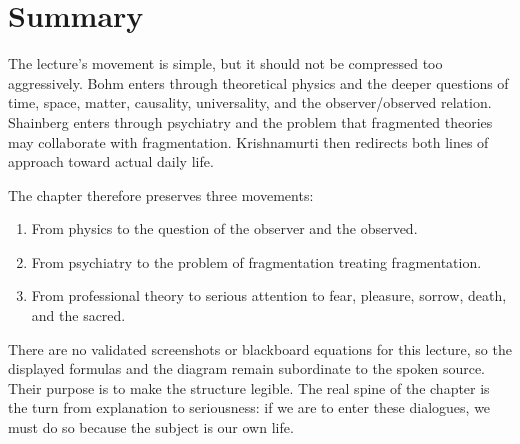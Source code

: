 \section{Summary}

The lecture's movement is simple, but it should not be compressed too aggressively. Bohm enters through theoretical physics and the deeper questions of time, space, matter, causality, universality, and the observer/observed relation. Shainberg enters through psychiatry and the problem that fragmented theories may collaborate with fragmentation. Krishnamurti then redirects both lines of approach toward actual daily life.

The chapter therefore preserves three movements:
\begin{enumerate}
\item From physics to the question of the observer and the observed.
\item From psychiatry to the problem of fragmentation treating fragmentation.
\item From professional theory to serious attention to fear, pleasure, sorrow, death, and the sacred.
\end{enumerate}
There are no validated screenshots or blackboard equations for this lecture, so the displayed formulas and the diagram remain subordinate to the spoken source. Their purpose is to make the structure legible. The real spine of the chapter is the turn from explanation to seriousness: if we are to enter these dialogues, we must do so because the subject is our own life.
